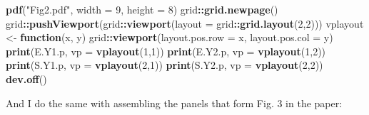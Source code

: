 \documentclass[10pt,A4,]{article}
\newenvironment{Shaded}{\begin{snugshade}}{\end{snugshade}}
\newcommand{\KeywordTok}[1]{\textcolor[rgb]{0.13,0.29,0.53}{\textbf{#1}}}
\newcommand{\DataTypeTok}[1]{\textcolor[rgb]{0.13,0.29,0.53}{#1}}
\newcommand{\DecValTok}[1]{\textcolor[rgb]{0.00,0.00,0.81}{#1}}
\newcommand{\StringTok}[1]{\textcolor[rgb]{0.31,0.60,0.02}{#1}}
\newcommand{\ControlFlowTok}[1]{\textcolor[rgb]{0.13,0.29,0.53}{\textbf{#1}}}
\newcommand{\OperatorTok}[1]{\textcolor[rgb]{0.81,0.36,0.00}{\textbf{#1}}}
\newcommand{\NormalTok}[1]{#1}
\begin{document}
\begin{Shaded}
\begin{Highlighting}[]
\KeywordTok{pdf}\NormalTok{(}\StringTok{"Fig2.pdf"}\NormalTok{, }\DataTypeTok{width =} \DecValTok{9}\NormalTok{, }\DataTypeTok{height =} \DecValTok{8}\NormalTok{)}
\NormalTok{grid}\OperatorTok{::}\KeywordTok{grid.newpage}\NormalTok{()}
\NormalTok{grid}\OperatorTok{::}\KeywordTok{pushViewport}\NormalTok{(grid}\OperatorTok{::}\KeywordTok{viewport}\NormalTok{(}\DataTypeTok{layout =}\NormalTok{ grid}\OperatorTok{::}\KeywordTok{grid.layout}\NormalTok{(}\DecValTok{2}\NormalTok{,}\DecValTok{2}\NormalTok{)))}
\NormalTok{vplayout <-}\StringTok{ }\ControlFlowTok{function}\NormalTok{(x, y) grid}\OperatorTok{::}\KeywordTok{viewport}\NormalTok{(}\DataTypeTok{layout.pos.row =}\NormalTok{ x, }\DataTypeTok{layout.pos.col =}\NormalTok{ y)}
\KeywordTok{print}\NormalTok{(E.Y1.p, }\DataTypeTok{vp =} \KeywordTok{vplayout}\NormalTok{(}\DecValTok{1}\NormalTok{,}\DecValTok{1}\NormalTok{))}
\KeywordTok{print}\NormalTok{(E.Y2.p, }\DataTypeTok{vp =} \KeywordTok{vplayout}\NormalTok{(}\DecValTok{1}\NormalTok{,}\DecValTok{2}\NormalTok{))}
\KeywordTok{print}\NormalTok{(S.Y1.p, }\DataTypeTok{vp =} \KeywordTok{vplayout}\NormalTok{(}\DecValTok{2}\NormalTok{,}\DecValTok{1}\NormalTok{))}
\KeywordTok{print}\NormalTok{(S.Y2.p, }\DataTypeTok{vp =} \KeywordTok{vplayout}\NormalTok{(}\DecValTok{2}\NormalTok{,}\DecValTok{2}\NormalTok{))}
\KeywordTok{dev.off}\NormalTok{()}
\end{Highlighting}
\end{Shaded}

And I do the same with assembling the panels that form Fig. 3 in the
paper:
\end{document}
